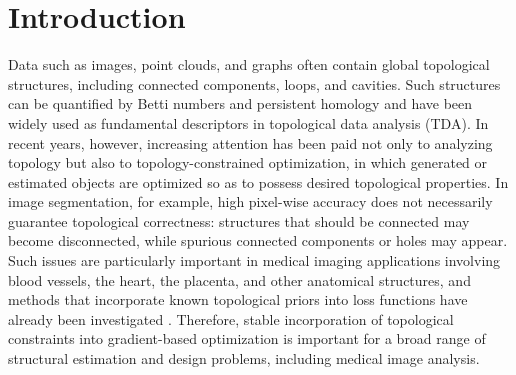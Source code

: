 \documentclass[pdflatex,sn-mathphys-num]{sn-jnl}%
\theoremstyle{thmstyleone}%
\theoremstyle{thmstyletwo}%
\theoremstyle{thmstylethree}%
\begin{document}
\section{Introduction}

Data such as images, point clouds, and graphs often contain global topological structures, including connected components, loops, and cavities. Such structures can be quantified by Betti numbers and persistent homology and have been widely used as fundamental descriptors in topological data analysis (TDA)\cite{edelsbrunner2002topological,zomorodian2004computing,cohen2005stability,ghrist2008barcodes,edelsbrunner2008persistent,carlsson2009topology,niyogi2008finding,de2007coverage,otter2017roadmap,obayashi2022persistent,nakamura2015persistent,hiraoka2016hierarchical,adams2017persistence,hofer2017deep,chazal2014stochastic,kalivsnik2019tropical}. In recent years, however, increasing attention has been paid not only to analyzing topology but also to topology-constrained optimization, in which generated or estimated objects are optimized so as to possess desired topological properties. In image segmentation, for example, high pixel-wise accuracy does not necessarily guarantee topological correctness: structures that should be connected may become disconnected, while spurious connected components or holes may appear. Such issues are particularly important in medical imaging applications involving blood vessels, the heart, the placenta, and other anatomical structures, and methods that incorporate known topological priors into loss functions have already been investigated \cite{clough2020topological,hu2019topology,shit2021cldice,byrne2022persistent,mosinska2018beyond,stucki2023topologically,demir2023topology}. Therefore, stable incorporation of topological constraints into gradient-based optimization is important for a broad range of structural estimation and design problems, including medical image analysis.
\end{document}
